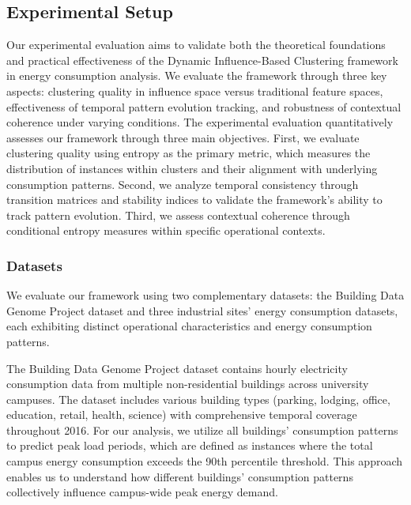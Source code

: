 \documentclass[final,5p,times,twocolumn,numbers]{elsarticle}
\begin{document}
\subsection{Experimental Setup}
Our experimental evaluation aims to validate both the theoretical foundations and practical effectiveness of the Dynamic Influence-Based Clustering framework in energy consumption analysis. We evaluate the framework through three key aspects: clustering quality in influence space versus traditional feature spaces, effectiveness of temporal pattern evolution tracking, and robustness of contextual coherence under varying conditions. The experimental evaluation quantitatively assesses our framework through three main objectives. First, we evaluate clustering quality using entropy as the primary metric, which measures the distribution of instances within clusters and their alignment with underlying consumption patterns. Second, we analyze temporal consistency through transition matrices and stability indices to validate the framework's ability to track pattern evolution. Third, we assess contextual coherence through conditional entropy measures within specific operational contexts.
\subsubsection{Datasets}
We evaluate our framework using two complementary datasets: the Building Data Genome Project dataset and three industrial sites' energy consumption datasets, each exhibiting distinct operational characteristics and energy consumption patterns.

The Building Data Genome Project dataset \cite{miller2020building}  contains hourly electricity consumption data from multiple non-residential buildings across university campuses. The dataset includes various building types (parking, lodging, office, education, retail, health, science) with comprehensive temporal coverage throughout 2016. For our analysis, we utilize all buildings' consumption patterns to predict peak load periods, which are defined as instances where the total campus energy consumption exceeds the 90th percentile threshold. This approach enables us to understand how different buildings' consumption patterns collectively influence campus-wide peak energy demand.
\end{document}
